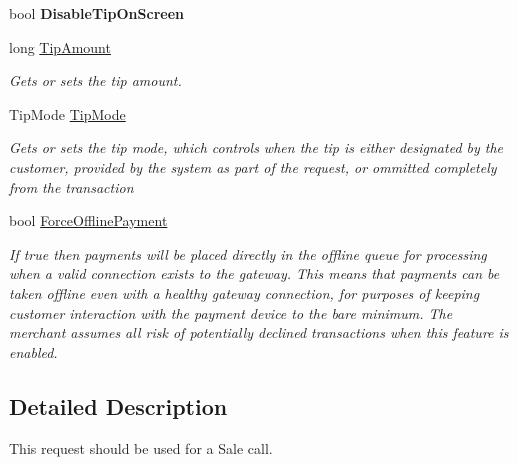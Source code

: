 \begin{DoxyCompactItemize}
\mbox{\label{classcom_1_1clover_1_1remotepay_1_1sdk_1_1_sale_request_a1ecc113e6e74c09bcfdb22fde2935693}} 
bool {\bfseries Disable\+Tip\+On\+Screen}
\item 
long \hyperlink{classcom_1_1clover_1_1remotepay_1_1sdk_1_1_sale_request_a2c5929123c6d790a089b31cb1f6661fc}{Tip\+Amount}
\begin{DoxyCompactList}\small\item\em Gets or sets the tip amount. \end{DoxyCompactList}\item 
Tip\+Mode \hyperlink{classcom_1_1clover_1_1remotepay_1_1sdk_1_1_sale_request_a18d23b1e889f262b8586511f983fd54c}{Tip\+Mode}
\begin{DoxyCompactList}\small\item\em Gets or sets the tip mode, which controls when the tip is either designated by the customer, provided by the system as part of the request, or ommitted completely from the transaction \end{DoxyCompactList}\item 
bool \hyperlink{classcom_1_1clover_1_1remotepay_1_1sdk_1_1_sale_request_a3b9ec1f158eda7a094c83a34a6c2e02a}{Force\+Offline\+Payment}
\begin{DoxyCompactList}\small\item\em If true then payments will be placed directly in the offline queue for processing when a valid connection exists to the gateway. This means that payments can be taken offline even with a healthy gateway connection, for purposes of keeping customer interaction with the payment device to the bare minimum. The merchant assumes all risk of potentially declined transactions when this feature is enabled. \end{DoxyCompactList}\end{DoxyCompactItemize}


\subsection{Detailed Description}
This request should be used for a Sale call. 




